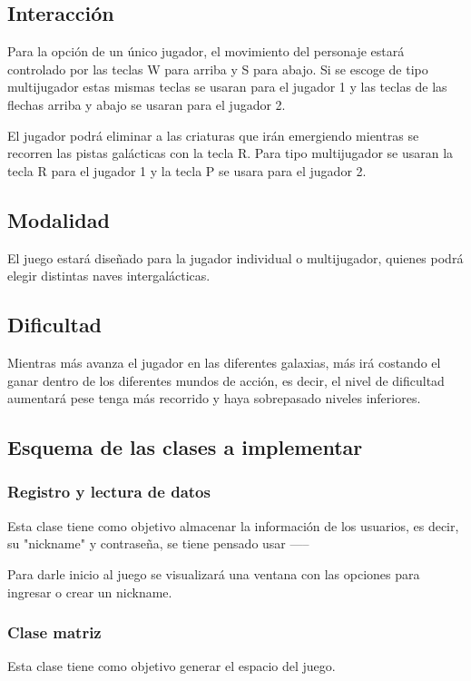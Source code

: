 \documentclass{article}
\begin{document}
\subsection{Interacción}
Para la opción de un único jugador, el movimiento del personaje estará controlado por las teclas W para arriba y S para abajo. Si se escoge de tipo multijugador estas mismas teclas se usaran para el jugador 1 y las teclas de las flechas arriba y abajo se usaran para el jugador 2.


El jugador podrá eliminar a las criaturas que irán emergiendo mientras se recorren las pistas galácticas con la tecla R. Para tipo multijugador se usaran la tecla R para el jugador 1 y la tecla P se usara para el jugador 2.

\subsection{Modalidad}
El juego estará diseñado para la jugador individual o multijugador, quienes podrá elegir distintas naves intergalácticas.

\subsection{Dificultad}
Mientras más avanza el jugador en las diferentes galaxias, más irá costando el ganar dentro de los diferentes mundos de acción, es decir, el nivel de dificultad aumentará pese tenga más recorrido y haya sobrepasado niveles inferiores. 

\subsection{Esquema de las clases a implementar}

\subsubsection{Registro y lectura de datos}
Esta clase tiene como objetivo almacenar la información de los usuarios, es decir, su "nickname" y contraseña, se tiene pensado usar -----

Para darle inicio al juego se visualizará una ventana con las opciones para ingresar o crear un nickname.

\subsubsection{Clase matriz }
Esta clase tiene como objetivo generar el espacio del juego.
\end{document}
